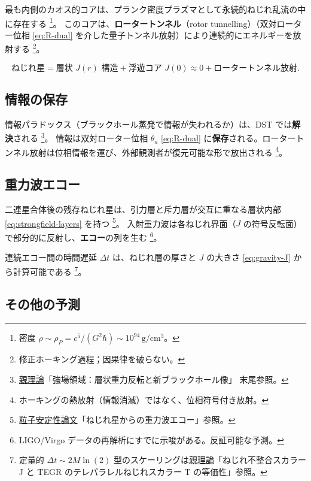 \documentclass[dvipdfmx,a4paper,oneside]{jsbook}
\numberwithin{equation}{chapter}
\begin{document}
最も内側のカオス的コアは、プランク密度プラズマとして永続的ねじれ乱流の中に存在する \footnote{密度 \(\rho \sim \rho_P = c^5/(G^2\hbar) \sim 10^{94}\,\mathrm{g/cm^3}\)。}。
このコアは、\textbf{ロータートンネル}（rotor tunnelling）（双対ローター位相 \eqref{eq:R-dual} を介した量子トンネル放射）により連続的にエネルギーを放射する \footnote{修正ホーキング過程；因果律を破らない。}。

\begin{equation}
  \boxed{\;
  \text{ねじれ星}
  = \text{層状 } J(r) \text{ 構造}
  + \text{浮遊コア } J(0) \approx 0
  + \text{ロータートンネル放射}.
  \;}
  \label{eq:strongfield-torsion-star}
\end{equation}

\subsection{情報の保存}

情報パラドックス（ブラックホール蒸発で情報が失われるか）は、DST では\textbf{解決}される \footnote{\hyperref[sec:sister-manuscripts]{親理論}「強場領域：層状重力反転と新ブラックホール像」 末尾参照。}。
情報は双対ローター位相 \(\theta_a\) \eqref{eq:R-dual} に\textbf{保存}される。ロータートンネル放射は位相情報を運び、外部観測者が復元可能な形で放出される \footnote{ホーキングの熱放射（情報消滅）ではなく、位相符号付き放射。}。

\subsection{重力波エコー}

二連星合体後の残存ねじれ星は、引力層と斥力層が交互に重なる層状内部 \eqref{eq:strongfield-layers} を持つ \footnote{\hyperref[sec:sister-manuscripts]{粒子安定性論文}「ねじれ星からの重力波エコー」参照。}。
入射重力波は各ねじれ界面（\(J\) の符号反転面）で部分的に反射し、\textbf{エコー}の列を生む \footnote{LIGO/Virgo データの再解析にすでに示唆がある。反証可能な予測。}。

連続エコー間の時間遅延 \(\Delta t\) は、ねじれ層の厚さと \(J\) の大きさ \eqref{eq:gravity-J} から計算可能である \footnote{定量的 \(\Delta t \sim 2M\ln(2)\) 型のスケーリングは\hyperref[sec:sister-manuscripts]{親理論}「ねじれ不整合スカラー J と TEGR のテレパラレルねじれスカラー T の等価性」参照。}。

\subsection{その他の予測}
\end{document}
